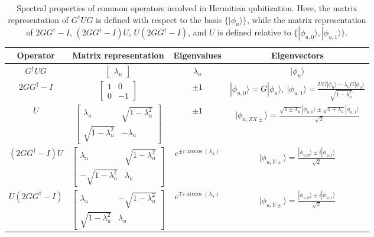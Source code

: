 \documentclass[letterpaper,onecolumn,11pt,accepted=2026-02-14]{quantumarticle}
\theoremstyle{remark}
\theoremstyle{plain}
\newcommand{\ket}[1]{|#1\rangle}
\begin{document}
\begin{table}
    \centering
    \begin{tabular}{c|c|c|c}
        Operator & Matrix representation & Eigenvalues & Eigenvectors\\
        \hline
        $G^\dagger UG$ & $\left[\begin{smallmatrix}
            \lambda_u
        \end{smallmatrix}\right]$ & $\lambda_u$ & $\ket{\phi_u}$\\
        $2GG^\dagger-I$ & $\left[\begin{smallmatrix}
            1 & 0 \\
            0 & -1
        \end{smallmatrix}\right]$ & $\pm1$ & $\ket{\phi_{u,0}}=G\ket{\phi_u},\ \ket{\phi_{u,1}}=\frac{UG\ket{\phi_u}-\lambda_uG\ket{\phi_u}}{\sqrt{1-\lambda_u^2}}$ \\
    $U$ & $\left[\begin{smallmatrix}
            \lambda_u & \sqrt{1-\lambda_u^2}\\
            \sqrt{1-\lambda_u^2} & -\lambda_u
        \end{smallmatrix}\right]$ & $\pm1$ & $\ket{\phi_{u,ZX\pm}}=\frac{\sqrt{1\pm\lambda_u}\ket{\phi_{u,0}}\pm\sqrt{1\mp\lambda_u}\ket{\phi_{u,1}}}{\sqrt{2}}$\\
        $\left(2GG^\dagger-I\right)U$ & $\left[\begin{smallmatrix}
        \lambda_u & \sqrt{1-\lambda_u^2}\\
        -\sqrt{1-\lambda_u^2} & \lambda_u
    \end{smallmatrix}\right]$ & $e^{\pm i\arccos(\lambda_u)}$ & $\ket{\phi_{u,Y\pm}}=\frac{\ket{\phi_{u,0}}\pm i\ket{\phi_{u,1}}}{\sqrt{2}}$\\
    $U\left(2GG^\dagger-I\right)$ & $\left[\begin{smallmatrix}
        \lambda_u & -\sqrt{1-\lambda_u^2}\\
        \sqrt{1-\lambda_u^2} & \lambda_u
    \end{smallmatrix}\right]$ & $e^{\mp i\arccos(\lambda_u)}$ & $\ket{\phi_{u,Y\pm}}=\frac{\ket{\phi_{u,0}}\pm i\ket{\phi_{u,1}}}{\sqrt{2}}$\\
    \end{tabular}
    \caption{Spectral properties of common operators involved in Hermitian qubitization. Here, the matrix representation of $G^\dagger UG$ is defined with respect to the basis $\{\ket{\phi_u}\}$, while the matrix representation of $2GG^\dagger-I$, $\left(2GG^\dagger-I\right)U$, $U\left(2GG^\dagger-I\right)$, and $U$ is defined relative to $\{\ket{\phi_{u,0}},\ket{\phi_{u,1}}\}$.}
    \label{tab:qubitization_eigen}
\end{table}
\end{document}
